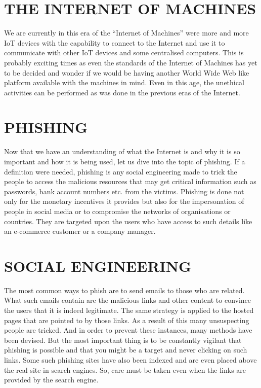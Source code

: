 \section{THE INTERNET OF MACHINES}
We are currently in this era of the “Internet of Machines” were more and more IoT devices with the capability to connect to the Internet and use it to communicate with other IoT devices and some centralised computers. This is probably exciting times as even the standards of the Internet of Machines has yet to be decided and wonder if we would be having another World Wide Web like platform available with the machines in mind. Even in this age, the unethical activities can be performed as was done in the previous eras of the Internet.

\section{PHISHING}
Now that we have an understanding of what the Internet is and why it is so important and how it is being used, let us dive into the topic of phishing. If a definition were needed, phishing is any social engineering made to trick the people to access the malicious resources that may get critical information such as passwords, bank account numbers etc. from the victims. Phishing is done not only for the monetary incentives it provides but also for the impersonation of people in social media or to compromise the networks of organisations or countries\cite{akerlof}. They are targeted upon the users who have access to such details like an e-commerce customer or a company manager. 

\section{SOCIAL ENGINEERING}
The most common ways to phish are to send emails to those who are related. What such emails contain are the malicious links and other content to convince the users that it is indeed legitimate. The same strategy is applied to the hosted pages that are pointed to by those links. As a result of this many unsuspecting people are tricked. And in order to prevent these instances, many methods have been devised. But the most important thing is to be constantly vigilant that phishing is possible and that you might be a target and never clicking on such links. Some such phishing sites have also been indexed and are even placed above the real site in search engines. So, care must be taken even when the links are provided by the search engine.

